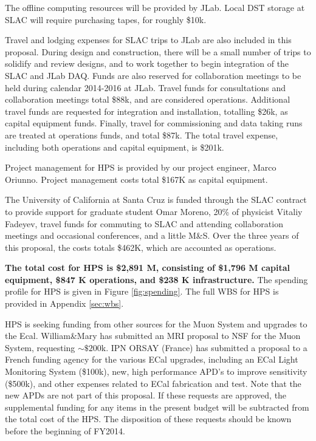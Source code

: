 The offline computing resources will be provided by JLab. Local DST storage at SLAC will require purchasing tapes, for roughly \$10k. 

Travel and lodging expenses for SLAC trips to JLab are also included in this proposal. During design and construction, 
there will be a small number of trips to solidify and review designs, and to work together to begin integration of the SLAC 
and JLab DAQ. Funds are also reserved for collaboration meetings to be held during calendar 2014-2016 at JLab. Travel funds for
consultations and collaboration meetings total \$88k, and are considered operations. Additional travel funds are requested for integration 
and installation, totalling \$26k, as capital equipment funds. Finally, travel for commissioning and data taking runs are treated at operations 
funds, and total \$87k. The total travel expense, including both operations and capital equipment, is \$201k.

Project management for HPS is provided by our project engineer, Marco Oriunno. Project management costs total \$167K as capital equipment.

The University of California at Santa Cruz is funded through the SLAC contract to provide support for graduate student Omar Moreno, 20\% of physicist
Vitaliy Fadeyev, travel funds for commuting to SLAC and attending collaboration meetings and occasional conferences, and a little M\&S. Over the three
years of this proposal, the costs totals \$462K, which are accounted as operations.


{\bf The total cost for HPS is \$2,891 M, consisting of \$1,796 M capital equipment, \$847 K operations, and \$238 K infrastructure. }
The spending profile for HPS is given in Figure \ref{fig:spending}. The full WBS for HPS is provided in Appendix \ref{sec:wbs}.

HPS is seeking funding from other sources for the Muon System and upgrades to the Ecal.
William\&Mary has submitted an MRI proposal to NSF for the Muon System, requesting $\sim \$200$k. IPN ORSAY (France) 
has submitted a proposal to a French funding agency for the various ECal upgrades, including an ECal Light Monitoring System (\$100k), new, 
high performance  APD's to improve sensitivity (\$500k), and other expenses related to ECal fabrication and test.
Note that the new APDs are not part of this proposal. If these requests are approved, the supplemental funding for any items in the present 
budget will be subtracted from the total cost of the HPS. The disposition of these requests should be known before the beginning of FY2014.

